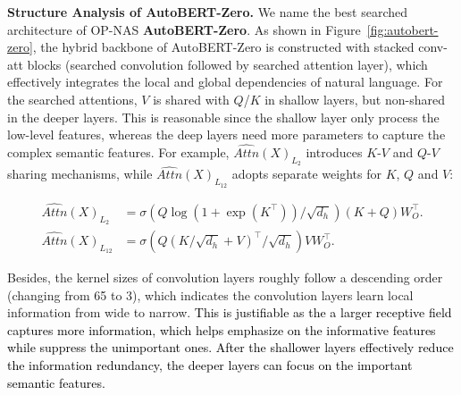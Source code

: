 \documentclass[letterpaper]{article} \usepackage{aaai22}  \usepackage{times}  \usepackage{helvet}  \usepackage{courier}  \usepackage[hyphens]{url}  \usepackage{graphicx} \urlstyle{rm} \def\UrlFont{\rm}  \usepackage{natbib}  \usepackage{caption} \DeclareCaptionStyle{ruled}{labelfont=normalfont,labelsep=colon,strut=off} \frenchspacing  \setlength{\pdfpagewidth}{8.5in}  \setlength{\pdfpageheight}{11in}  \usepackage{algorithm}
\newcommand{\prj}[1]{\textcolor{black}{#1}} \newcommand{\prjj}[1]{\textcolor{black}{#1}} \newcommand{\jhh}[1]{\textcolor{black}{#1}} \newcommand{\jh}[1]{\textcolor{black}{#1}} \newcommand{\sh}[1]{\textcolor{black}{#1}} \usepackage{multirow}
\begin{document}
\textbf{Structure Analysis of AutoBERT-Zero.} We name the best searched architecture of OP-NAS \textbf{AutoBERT-Zero}.
As shown in Figure~\ref{fig:autobert-zero},  
the hybrid backbone of AutoBERT-Zero is constructed with stacked conv-att blocks (searched convolution followed by searched attention layer), which effectively integrates the local and global dependencies of natural language.
For the searched attentions, 
$V$ is shared with $Q$/$K$ in shallow layers, but non-shared in the deeper layers. This is reasonable since the shallow layer only process the low-level features, whereas the deep layers need more parameters to capture the complex semantic features. For example, 
$\hat{Attn}(X)_{L_2}$ introduces $K$-$V$ and $Q$-$V$ sharing mechanisms, while $\hat{Attn}(X)_{L_{12}}$ adopts separate weights for $K$, $Q$ and $V$:
\vspace{-3mm}
\begin{small}
\begin{align*}
    \hat{Attn}(X)_{L_2}
    &=\sigma(Q\log(1+\exp(K^\top))/\sqrt{d_h})(K+Q)W_{O}^{\top}.\\
\hat{Attn}(X)_{L_{12}}
    &=\sigma(Q(K/\sqrt{d_h}+V)^\top/\sqrt{d_h})VW_{O}^{\top}. 
\end{align*}
\end{small}
\hspace{-2mm}
Besides, the kernel sizes of convolution layers roughly follow a descending order (changing from 65 to 3), which indicates the convolution layers learn local information from wide to narrow. \prj{This is justifiable as the a  larger receptive field captures more information, which helps emphasize on the informative features while suppress the unimportant ones. After the shallower layers effectively reduce the information redundancy, the deeper layers can focus on the important semantic features.} 
\end{document}

